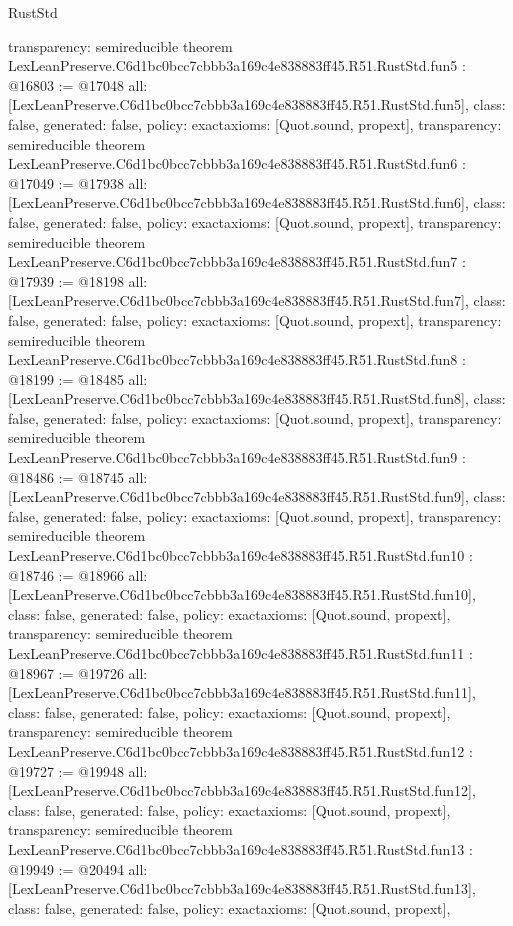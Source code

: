 \begin{lexlean}{RustStd}
\begin{coremodule}
{  transparency: semireducible
}
theorem LexLeanPreserve.C6d1bc0bcc7cbbb3a169c4e838883ff45.R51.RustStd.fun5 : @16803 := @17048 {
  all: [LexLeanPreserve.C6d1bc0bcc7cbbb3a169c4e838883ff45.R51.RustStd.fun5],
  class: false,
  generated: false,
  policy: exact{axioms: [Quot.sound, propext]},
  transparency: semireducible
}
theorem LexLeanPreserve.C6d1bc0bcc7cbbb3a169c4e838883ff45.R51.RustStd.fun6 : @17049 := @17938 {
  all: [LexLeanPreserve.C6d1bc0bcc7cbbb3a169c4e838883ff45.R51.RustStd.fun6],
  class: false,
  generated: false,
  policy: exact{axioms: [Quot.sound, propext]},
  transparency: semireducible
}
theorem LexLeanPreserve.C6d1bc0bcc7cbbb3a169c4e838883ff45.R51.RustStd.fun7 : @17939 := @18198 {
  all: [LexLeanPreserve.C6d1bc0bcc7cbbb3a169c4e838883ff45.R51.RustStd.fun7],
  class: false,
  generated: false,
  policy: exact{axioms: [Quot.sound, propext]},
  transparency: semireducible
}
theorem LexLeanPreserve.C6d1bc0bcc7cbbb3a169c4e838883ff45.R51.RustStd.fun8 : @18199 := @18485 {
  all: [LexLeanPreserve.C6d1bc0bcc7cbbb3a169c4e838883ff45.R51.RustStd.fun8],
  class: false,
  generated: false,
  policy: exact{axioms: [Quot.sound, propext]},
  transparency: semireducible
}
theorem LexLeanPreserve.C6d1bc0bcc7cbbb3a169c4e838883ff45.R51.RustStd.fun9 : @18486 := @18745 {
  all: [LexLeanPreserve.C6d1bc0bcc7cbbb3a169c4e838883ff45.R51.RustStd.fun9],
  class: false,
  generated: false,
  policy: exact{axioms: [Quot.sound, propext]},
  transparency: semireducible
}
theorem LexLeanPreserve.C6d1bc0bcc7cbbb3a169c4e838883ff45.R51.RustStd.fun10 : @18746 := @18966 {
  all: [LexLeanPreserve.C6d1bc0bcc7cbbb3a169c4e838883ff45.R51.RustStd.fun10],
  class: false,
  generated: false,
  policy: exact{axioms: [Quot.sound, propext]},
  transparency: semireducible
}
theorem LexLeanPreserve.C6d1bc0bcc7cbbb3a169c4e838883ff45.R51.RustStd.fun11 : @18967 := @19726 {
  all: [LexLeanPreserve.C6d1bc0bcc7cbbb3a169c4e838883ff45.R51.RustStd.fun11],
  class: false,
  generated: false,
  policy: exact{axioms: [Quot.sound, propext]},
  transparency: semireducible
}
theorem LexLeanPreserve.C6d1bc0bcc7cbbb3a169c4e838883ff45.R51.RustStd.fun12 : @19727 := @19948 {
  all: [LexLeanPreserve.C6d1bc0bcc7cbbb3a169c4e838883ff45.R51.RustStd.fun12],
  class: false,
  generated: false,
  policy: exact{axioms: [Quot.sound, propext]},
  transparency: semireducible
}
theorem LexLeanPreserve.C6d1bc0bcc7cbbb3a169c4e838883ff45.R51.RustStd.fun13 : @19949 := @20494 {
  all: [LexLeanPreserve.C6d1bc0bcc7cbbb3a169c4e838883ff45.R51.RustStd.fun13],
  class: false,
  generated: false,
  policy: exact{axioms: [Quot.sound, propext]},
}
\end{coremodule}
\end{lexlean}
